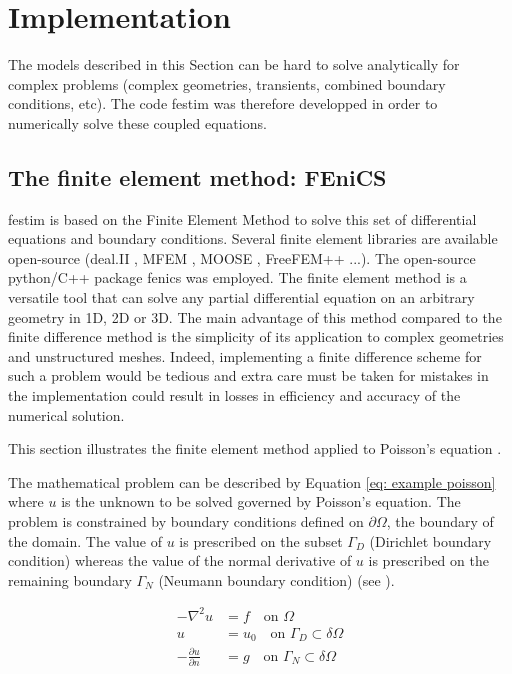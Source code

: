 \section{Implementation}


The models described in this Section can be hard to solve analytically for complex problems (complex geometries, transients, combined boundary conditions, etc).
The code \gls{festim}  was therefore developped in order to numerically solve these coupled equations.

\subsection{The finite element method: FEniCS}
\gls{festim} is based on the Finite Element Method to solve this set of differential equations and boundary conditions.
Several finite element libraries are available open-source (deal.II , MFEM , MOOSE , FreeFEM++ ...).
The open-source python/C++ package \gls{fenics}  was employed.
The finite element method is a versatile tool that can solve any partial differential equation on an arbitrary geometry in 1D, 2D or 3D.
The main advantage of this method compared to the finite difference method is the simplicity of its application to complex geometries and unstructured meshes.
Indeed, implementing a finite difference scheme for such a problem would be tedious and extra care must be taken for mistakes in the implementation could result in losses in efficiency and accuracy of the numerical solution.

This section illustrates the finite element method applied to Poisson's equation .

The mathematical problem can be described by Equation \ref{eq: example poisson} where $u$ is the unknown to be solved governed by Poisson's equation.
The problem is constrained by boundary conditions defined on $\partial \Omega$, the boundary of the domain.
The value of $u$ is prescribed on the subset $\Gamma_D$ (Dirichlet boundary condition) whereas the value of the normal derivative of $u$ is prescribed on the remaining boundary $\Gamma_N$ (Neumann boundary condition) (see ).

\begin{subequations}
    \begin{align}
        -\nabla^2 u &= f \quad \text{on    } \Omega \\
        u &= u_0 \quad \text{on    } \Gamma_D  \subset \delta \Omega \\
        -\frac{\partial u}{\partial n} &= g \quad \text{on    } \Gamma_N  \subset \delta \Omega
    \end{align}
    \label{eq: example poisson}
\end{subequations}


